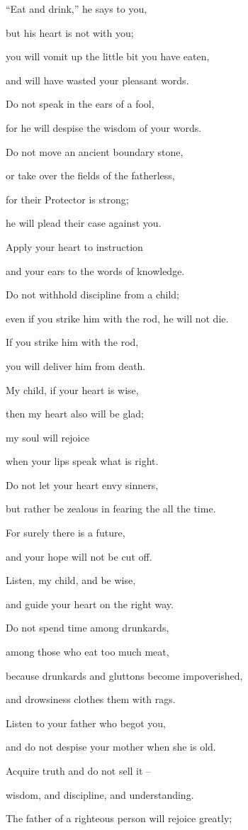 {\par }{\Q “Eat
and drink,”
he says
to you,
\par }{\Q but his heart
is not
with you;
\par }{\Q {}you will vomit
up the little bit
you have eaten,
\par }{\Q and will have wasted
your pleasant
words.
\par }{\Q {}Do not
speak
in the ears
of a fool,
\par }{\Q for
he will despise
the wisdom
of your words.
\par }{\Q {}Do not
move
an ancient
boundary
stone,
\par }{\Q or
take over
the fields
of the fatherless,
\par }{\Q {}for
their Protector
is strong;
\par }{\Q he
will plead
their case
against you.
\par }{\Q {}Apply
your heart
to instruction
\par }{\Q and your ears
to the words
of knowledge.
\par }{\Q {}Do not
withhold
discipline
from a child;
\par }{\Q even if
you strike
him with the rod,
he will not
die.
\par }{\Q {}If you
strike
him with the rod,
\par }{\Q you will deliver
him from death.
\par }{\Q {}My child,
if
your heart
is wise,
\par }{\Q then my heart
also
will be glad;
\par }{\Q {}my soul
will rejoice
\par }{\Q when your lips
speak
what is right.
\par }{\Q {}Do not
let your heart
envy
sinners,
\par }{\Q but rather
be zealous in fearing
the {}
all
the time.
\par }{\Q {}For
surely
there is
a future,
\par }{\Q and your hope
will not
be cut off.
\par }{\Q {}Listen,
my child,
and be wise,
\par }{\Q and guide
your heart
on the right way.
\par }{\Q {}Do not
spend time among drunkards,
\par }{\Q among those who eat too much
meat,
\par }{\Q {}because
drunkards
and gluttons
become impoverished,
\par }{\Q and drowsiness
clothes
them with rags.
\par }{\Q {}Listen
to your father
who begot
you,
\par }{\Q and do not
despise
your mother
when
she is old.
\par }{\Q {}Acquire
truth
and do not
sell it –
\par }{\Q wisdom, and discipline, and understanding.
\par }{\Q {}The father
of a righteous
person will rejoice
greatly;

}
